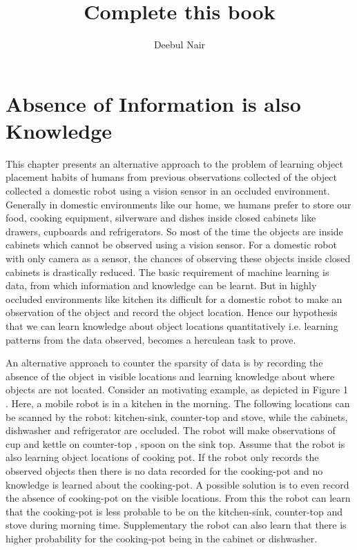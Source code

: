 \documentclass[11pt]{book}
\title{\textbf{Complete this book }}
\author{Deebul Nair}
\date{}
\begin{document}
\chapter{Absence of Information is also Knowledge}

This chapter presents an alternative approach to the problem of learning object placement habits of humans from previous observations collected of the object collected a domestic robot using a vision sensor in an occluded environment.
Generally in domestic environments like our home, we humans prefer to store our food, cooking equipment, silverware and dishes inside closed cabinets like drawers, cupboards and refrigerators. So most of the time the objects are inside cabinets which cannot be observed using a vision sensor. For a domestic robot with only camera as a sensor, the chances of observing  these objects inside closed cabinets is drastically reduced.
The basic requirement of machine learning is data, from which information and knowledge can be learnt. But in highly occluded environments like kitchen its difficult for a domestic robot to make an observation of the object and record the object location.  Hence our hypothesis that we can learn knowledge about object locations quantitatively i.e. learning patterns from the data observed, becomes a herculean task to prove.

An alternative approach to counter the sparsity of data is by recording the absence of the object in visible locations and learning knowledge about where objects are not located. Consider an motivating example, as depicted in Figure 1  . Here, a mobile robot is in a kitchen in the morning. The following locations can be scanned by the robot: kitchen-sink, counter-top and stove, while the cabinets, dishwasher and refrigerator are occluded. The robot will make observations of cup and kettle on counter-top , spoon on the sink top. Assume that the robot is also learning object locations of cooking pot. If the robot only records the observed objects then there is no data recorded for the cooking-pot and no knowledge is learned about the cooking-pot. A possible solution is to even record the absence of cooking-pot on the visible locations. From this the robot can learn that the cooking-pot is less probable to be on the kitchen-sink, counter-top and stove during morning time. Supplementary the robot can also learn that there is higher probability for the cooking-pot being in the cabinet or dishwasher.
\end{document}
